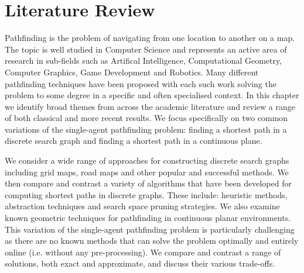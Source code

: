 \chapter{Literature Review}
\label{cha::lit}
Pathfinding is the problem of navigating from one location to another on a
map. The topic is well studied in Computer Science and represents an active
area of research in sub-fields such as Artifical Intelligence, Computational
Geometry, Computer Graphics, Game Development and Robotics.  Many different
pathfinding techniques have been proposed with each such work solving the
problem to some degree in a specific and often specialised context.  In this
chapter we identify broad themes from across the academic literature and
review a range of both classical and more recent results.  We focus
specifically on two common variations of the single-agent pathfinding problem:
finding a shortest path in a discrete search graph and finding a shortest path
in a continuous plane.

We consider a wide range of approaches for constructing discrete search graphs
including grid maps, road maps and other popular and successful methods.  We
then compare and contrast a variety of algorithms that have been developed for
computing shortest paths in discrete graphs. These include: heuristic methods,
abstraction techniques and search space pruning strategies.  We also examine
known geometric techniques for pathfinding in continuous planar environments.
This variation of the single-agent pathfinding problem is particularly
challenging as there are no known methods that can solve the problem optimally
and entirely online (i.e. without any pre-processing).  We compare and
contrast a range of solutions, both exact and approximate, and discuss their
various trade-offs.


